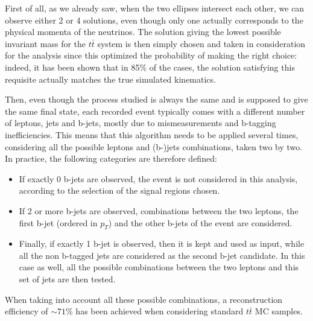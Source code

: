 \documentclass[a4paper, 10pt, openright]{report}
\begin{document}
First of all, as we already saw, when the two ellipses intersect each other, we can observe either 2 or 4 solutions, even though only one actually corresponds to the physical momenta of the neutrinos. The solution giving the lowest possible invariant mass for the $t \bar t$ system is then simply chosen and taken in consideration for the analysis since this optimized the probability of making the right choice: indeed, it has been shown \cite{rightChoice} that in 85\% of the cases, the solution satisfying this requisite actually matches the true simulated kinematics.

Then, even though the process studied is always the same and is supposed to give the same final state, each recorded event typically comes with a different number of leptons, jets and b-jets, mostly due to mismeasurements and b-tagging inefficiencies. This means that this algorithm needs to be applied several times, considering all the possible leptons and (b-)jets combinations, taken two by two. In practice, the following categories are therefore defined: 
\begin{itemize}
\item If exactly 0 b-jets are observed, the event is not considered in this analysis, according to the selection of the signal regions chosen.
\item If 2 or more b-jets are observed, combinations between the two leptons, the first b-jet (ordered in $p_T$) and the other b-jets of the event are considered.
\item Finally, if exactly 1 b-jet is observed, then it is kept and used as input, while all the non b-tagged jets are considered as the second b-jet candidate. In this case as well, all the possible combinations between the two leptons and this set of jets are then tested.
\end{itemize}

When taking into account all these possible combinations, a reconstruction efficiency of $\sim 71$\% has been achieved when considering standard $t \bar t$ \ac{MC} samples. 
\end{document}
